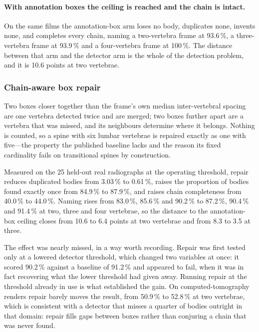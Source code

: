 \documentclass[11pt,letterpaper]{article}
\begin{document}
\paragraph{With annotation boxes the ceiling is reached and the chain is intact.} On the same films the annotation-box arm loses no body, duplicates none, invents none, and completes every chain, naming a two-vertebra frame at 93.6\,\%, a three-vertebra frame at 93.9\,\% and a four-vertebra frame at 100\,\%. The distance between that arm and the detector arm is the whole of the detection problem, and it is 10.6 points at two vertebrae.


\subsubsection*{Chain-aware box repair}
Two boxes closer together than the frame's own median inter-vertebral spacing are one vertebra detected twice and are merged; two boxes further apart are a vertebra that was missed, and its neighbours determine where it belongs. Nothing is counted, so a spine with six lumbar vertebrae is repaired exactly as one with five---the property the published baseline lacks and the reason its fixed cardinality fails on transitional spines by construction.

Measured on the 25 held-out real radiographs at the operating threshold, repair reduces duplicated bodies from 3.03\,\% to 0.61\,\%, raises the proportion of bodies found exactly once from 84.9\,\% to 87.9\,\%, and raises chain completeness from 40.0\,\% to 44.0\,\%. Naming rises from 83.0\,\%, 85.6\,\% and 90.2\,\% to 87.2\,\%, 90.4\,\% and 91.4\,\% at two, three and four vertebrae, so the distance to the annotation-box ceiling closes from 10.6 to 6.4 points at two vertebrae and from 8.3 to 3.5 at three.

The effect was nearly missed, in a way worth recording. Repair was first tested only at a lowered detector threshold, which changed two variables at once: it scored 90.2\,\% against a baseline of 91.2\,\% and appeared to fail, when it was in fact recovering what the lower threshold had given away. Running repair at the threshold already in use is what established the gain. On computed-tomography renders repair barely moves the result, from 50.9\,\% to 52.8\,\% at two vertebrae, which is consistent with a detector that misses a quarter of bodies outright in that domain: repair fills gaps between boxes rather than conjuring a chain that was never found.
\end{document}

